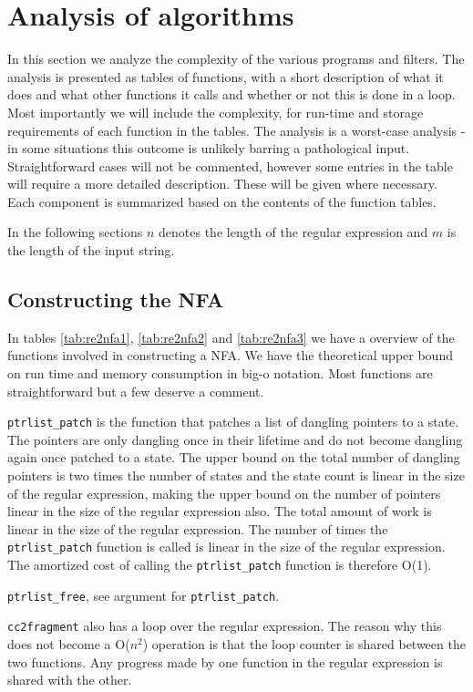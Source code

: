 \section{Analysis of algorithms}
\label{sec:theoretical}
In this section we analyze the complexity of the various programs and
filters. The analysis is presented as tables of functions, with a
short description of what it does and what other functions it calls
and whether or not this is done in a loop. Most importantly we will
include the complexity, for run-time and storage requirements of each
function in the tables. The analysis is a worst-case analysis - in
some situations this outcome is unlikely barring a pathological
input. Straightforward cases will not be commented, however some
entries in the table will require a more detailed description. These
will be given where necessary. Each component is summarized based on
the contents of the function tables.

In the following sections $n$ denotes the length of the regular
expression and $m$ is the length of the input string.


\subsection{Constructing the NFA}

In tables \ref{tab:re2nfa1}, \ref{tab:re2nfa2} and \ref{tab:re2nfa3}
we have a overview of the functions involved in constructing a NFA. We
have the theoretical upper bound on run time and memory consumption in
big-o notation. Most functions are straightforward but a few deserve a
comment. 

\lstinline{ptrlist_patch} is the function that patches a list of
dangling pointers to a state. The pointers are only dangling once in
their lifetime and do not become dangling again once 
patched to a state. The upper bound on the total number of dangling
pointers is two times the number of states and the state count is
linear in the size of the regular expression, making the upper bound
on the number of pointers linear in the size of the regular expression
also. The total amount of work is linear in the size of the regular
expression. The number of times the \lstinline{ptrlist_patch} function
is called is linear in the size of the regular expression. The
amortized cost of calling the \lstinline{ptrlist_patch} function is
therefore O(1).

\lstinline{ptrlist_free}, see argument for \lstinline{ptrlist_patch}.

\lstinline{cc2fragment} also has a loop over the regular
expression. The reason why this does not become a O($n^2$) operation is
that the loop counter is shared between the two functions. Any
progress made by one function in the regular expression is shared with
the other.

